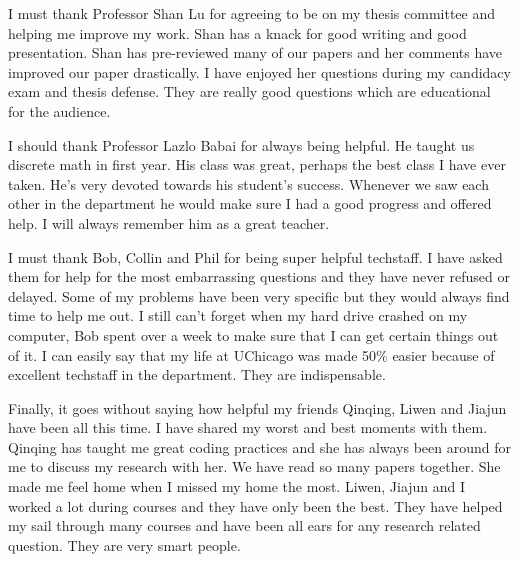 I must thank Professor Shan Lu for agreeing to be on my thesis committee and helping me improve my work. 
Shan has a knack for good writing and good presentation. Shan has pre-reviewed many of our 
papers and her comments have improved our paper drastically. I have enjoyed her questions 
during my candidacy exam and thesis defense. They are really good questions which are educational for the audience.

I should thank Professor Lazlo Babai for always being helpful. He taught us discrete math in first year. His class was
great, perhaps the best class I have ever taken. He's very devoted towards his student's success. Whenever we 
saw each other in the department he would make sure I had a good progress and offered help. I will always remember 
him as a great teacher. 

I must thank Bob, Collin and Phil for being super helpful techstaff. I have asked them for help for the most 
embarrassing questions and they have never refused or delayed. Some of my problems have been very specific but they would 
always find time to help me out. I still can't forget when my hard drive crashed on my computer, 
Bob spent over a week to make sure that I can get certain things out of it. I can easily say that my life at 
UChicago was made 50\% easier because of excellent techstaff in the department. They are indispensable.

Finally, it goes without saying how helpful my friends Qinqing, Liwen and Jiajun have been all this time.
I have shared my worst and best moments with them. Qinqing has taught me great coding practices and she has 
always been around for me to discuss my research with her. We have read so many papers together. She made me feel home 
when I missed my home the most. Liwen, Jiajun and I worked a lot during courses and
they have only been the best. They have helped my sail through many courses and have been all ears for any research related question.
They are very smart people.
